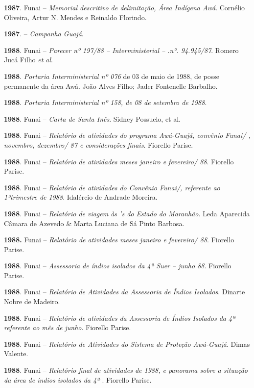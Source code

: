 \begin{Parskip}
\textbf{1987}. Funai -- \emph{Memorial descritivo de delimitação, Área
Indígena Awá}. Cornélio Oliveira, Artur N. Mendes e Reinaldo Florindo.

\textbf{1987}.  -- \emph{Campanha Guajá}.

\textbf{1988}. Funai -- \emph{Parecer nº 197/88 --  Interministerial
-- .nº. 94.945/87}. Romero Jucá Filho \emph{et al}.

\textbf{1988}. \emph{Portaria Interministerial nº 076} de 03 de maio de
1988, de posse permanente da área Awá. João Alves Filho; Jader
Fontenelle Barbalho.

\textbf{1988}. \emph{Portaria Interministerial nº 158, de 08 de setembro
de 1988}.

\textbf{1988}. Funai -- \emph{Carta de Santa Inês}. Sidney Possuelo, et
al.

\textbf{1988}. Funai -- \emph{Relatório de atividades do programa
Awá-Guajá, convênio Funai/ , novembro, dezembro/ 87 e considerações
finais}. Fiorello Parise.

\textbf{1988}. Funai -- \emph{Relatório de atividades meses janeiro e
fevereiro/ 88}. Fiorello Parise.

\textbf{1988}. Funai -- \emph{Relatório de atividades do Convênio
Funai/, referente ao 1ºtrimestre de 1988}. Idalércio de Andrade
Moreira.

\textbf{1988}. Funai -- \emph{Relatório de viagem às 's do Estado do
Maranhão}. Leda Aparecida Câmara de Azevedo \& Marta Luciana de Sá Pinto
Barbosa.

\textbf{1988.} Funai -- \emph{Relatório de atividades meses janeiro e
fevereiro/ 88}. Fiorello Parise.

\textbf{1988}. Funai -- \emph{Assessoria de índios isolados da 4ª Suer
-- junho 88}. Fiorello Parise.

\textbf{1988}. Funai -- \emph{Relatório de Atividades da Assessoria de
Índios Isolados}. Dinarte Nobre de Madeiro.

\textbf{1988}. Funai -- \emph{Relatório de atividades da Assessoria de
Índios Isolados da 4ª  referente ao mês de junho}. Fiorello Parise.

\textbf{1988}. Funai -- \emph{Relatório de Atividades do Sistema de
Proteção Awá-Guajá}. Dimas Valente.

\textbf{1988}. Funai -- \emph{Relatório final de atividades de 1988, e
panorama sobre a situação da área de índios isolados da 4ª }.
Fiorello Parise.


\end{Parskip}
